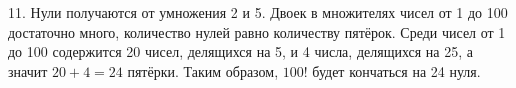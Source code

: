11. Нули получаются от умножения 2 и 5. Двоек в множителях чисел от 1 до 100 достаточно много, количество нулей равно количеству пятёрок. Среди чисел от 1 до 100 содержится 20 чисел, делящихся на 5, и 4 числа, делящихся на 25, а значит $20+4=24$ пятёрки. Таким образом, $100!$ будет кончаться на 24 нуля.\\
